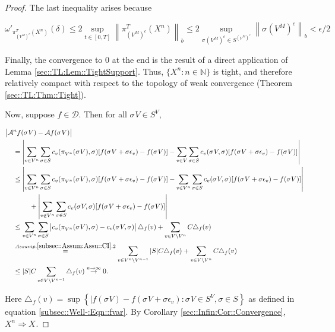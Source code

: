 \documentclass[12pt]{article}
\newcommand{\mb}{\mathbb}
\newcommand{\mc}{\mathcal}
\newcommand{\ra}{\rightarrow}
\newcommand{\os}{\overset}
\newcommand{\ep}{\epsilon}
\newcommand{\ind}{\hspace{24pt}}
\renewcommand{\v}{v}							%
\renewcommand{\S}{S}							%
\newcommand{\s}{\sigma}							%
\newcommand{\sv}[1]{\s^{#1}}					%
\renewcommand{\b}[1]{b_{#1}}					%
\newcommand{\ev}[1]{\ep_{#1}}					%
\newcommand{\T}{T}								%
\renewcommand{\t}{t}							%
\newcommand{\IG}{\mc{A}}						%
\newcommand{\pup}[1]{^{#1}}							%
\newcommand{\core}{\mc{D}}							%
\newcommand{\V}{V}									%
\newcommand{\numb}{n}								%
\newcommand{\XState}[1]{\S^{#1}}				%
\newcommand{\piV}[2]{\pi_{#1}^{#2}}					%
\newcommand{\rxvts}[2]{X_{#1}{#2}}					%
\newcommand{\rxvtsn}[3]{X_{#1}^{#3}{#2}}			%
\newcommand{\IGr}[1]{c_{#1}}						%
\newcommand{\const}[1]{C_{#1}}						%
\begin{document}
\begin{proof}
The last inequality arises because

\[\omega'_{\piV{\left(\V\pup{M}\right)^c}{\T}(\rxvtsn{}{}{\numb})}(\delta) \leq 2 \sup_{\t\in [0,\T]} \left\|\piV{\left(\V\pup{M}\right)^c}{\T}(\rxvtsn{}{}{\numb})\right\|_{\b{}} \leq 2 \sup_{\sv{}{\left(\V\pup{M}\right)^c} \in \S^{\left(\V\pup{M}\right)^c}} \left\|\sv{}{\left(\V\pup{M}\right)^c}\right\|_{\b{}} < \ep/2\]

Finally, the convergence to 0 at the end is the result of a direct application of Lemma \ref{sec::TL:Lem::TightSupport}. Thus, \(\{\rxvtsn{}{}{\numb}:\numb\in \mb{N}\}\) is tight, and therefore relatively compact with respect to the topology of weak convergence (Theorem \ref{sec::TL:Thm::Tight}).

Now, suppose \(f\in \core\). Then for all \(\sv{}{\V} \in \S^\V\),

\begin{align*}
\big|\IG&\pup{\numb}f(\sv{}{\V}) - \IG f(\sv{}{\V})\big|\\
&= \left|\sum_{\v \in \V\pup{\numb}} \sum_{\s \in \S} \IGr{\v}(\piV{\V\pup{\numb}}{}(\sv{}{\V}),\s)[f(\sv{}{\V}+\s\ev{\v}) - f(\sv{}{\V})] - \sum_{\v \in \V}\sum_{\s \in \S} \IGr{\v}(\sv{}{\V},\s)[f(\sv{}{\V}+\s\ev{\v}) - f(\sv{}{\V})]\right|\\
&\leq  \left|\sum_{\v \in \V\pup{\numb}} \sum_{\s \in \S} \IGr{\v}(\piV{\V\pup{\numb}}{}(\sv{}{\V}),\s)[f(\sv{}{\V}+\s\ev{\v}) - f(\sv{}{\V})] - \sum_{\v \in \V\pup{\numb}}\sum_{\s \in \S} \IGr{\v}(\sv{}{\V},\s)[f(\sv{}{\V}+\s\ev{\v}) - f(\sv{}{\V})]\right|\\
&\ind  +\left|\sum_{\v \notin \V\pup{\numb}} \sum_{\s\in \S} \IGr{\v}(\sv{}{\V},\s)[f(\sv{}{\V}+\s\ev{\v}) - f(\sv{}{\V})]\right|\\
&\leq \sum_{\v \in \V\pup{\numb}}\sum_{\s \in \S} \left|\IGr{\v}(\piV{\V\pup{\numb}}{}(\sv{}{\V}),\s) - \IGr{\v}(\sv{}{\V},\s)\right|\triangle_f(\v) + \sum_{\v \in \V\setminus \V\pup{\numb}} \const{}\triangle_f(\v)\\
&\os{Assump. \ref{subsec::Assum:Assu::CI}.2}{=} \sum_{\v \in \V\pup{\numb}\setminus\V\pup{\numb-1}} |\S|\const{} \triangle_f(\v) + \sum_{\v \in \V\setminus \V\pup{\numb}} \const{}\triangle_f(\v)\\
&\leq |\S|C\sum_{\v \in \V\setminus \V\pup{\numb-1}} \triangle_f(\v) \os{n\ra\infty}{\ra} 0.
\end{align*}

Here \(\triangle_f(\v) = \sup\left\{|f(\sv{}{\V}) - f(\sv{}{\V} + \s\ev{\v}): \sv{}{\V}\in \S^\V,\s \in \S\right\}\) as defined in equation \eqref{subsec::Well-:Eqn::fvar}. By Corollary \ref{sec::Infin:Cor::Convergence}, \(\rxvtsn{}{}{\numb}\Rightarrow \rxvts{}{}\).
\end{proof}
\end{document}
